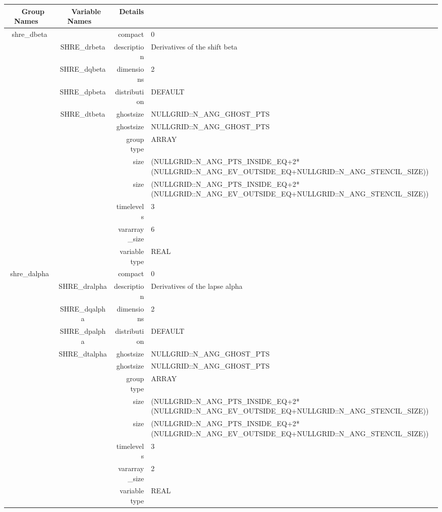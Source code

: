 \begin{tabular*}{150mm}{|c|c@{\extracolsep{\fill}}|rl|} \hline 
~ {\bf Group Names} ~ & ~ {\bf Variable Names} ~  &{\bf Details} ~ & ~ \\ 
\hline 
shre\_dbeta &  & compact & 0 \\ 
 & SHRE\_drbeta & description & Derivatives of the shift beta \\ 
 & SHRE\_dqbeta & dimensions & 2 \\ 
 & SHRE\_dpbeta & distribution & DEFAULT \\ 
 & SHRE\_dtbeta & ghostsize & NULLGRID::N\_ANG\_GHOST\_PTS \\ 
& ~ & ghostsize & NULLGRID::N\_ANG\_GHOST\_PTS \\ 
 &  & group type & ARRAY \\ 
 &  & size & (NULLGRID::N\_ANG\_PTS\_INSIDE\_EQ+2*(NULLGRID::N\_ANG\_EV\_OUTSIDE\_EQ+NULLGRID::N\_ANG\_STENCIL\_SIZE)) \\ 
& ~ & size & (NULLGRID::N\_ANG\_PTS\_INSIDE\_EQ+2*(NULLGRID::N\_ANG\_EV\_OUTSIDE\_EQ+NULLGRID::N\_ANG\_STENCIL\_SIZE)) \\ 
 &  & timelevels & 3 \\ 
 &  & vararray\_size & 6 \\ 
 &  & variable type & REAL \\ 
\hline 
shre\_dalpha &  & compact & 0 \\ 
 & SHRE\_dralpha & description & Derivatives of the lapse alpha \\ 
 & SHRE\_dqalpha & dimensions & 2 \\ 
 & SHRE\_dpalpha & distribution & DEFAULT \\ 
 & SHRE\_dtalpha & ghostsize & NULLGRID::N\_ANG\_GHOST\_PTS \\ 
& ~ & ghostsize & NULLGRID::N\_ANG\_GHOST\_PTS \\ 
 &  & group type & ARRAY \\ 
 &  & size & (NULLGRID::N\_ANG\_PTS\_INSIDE\_EQ+2*(NULLGRID::N\_ANG\_EV\_OUTSIDE\_EQ+NULLGRID::N\_ANG\_STENCIL\_SIZE)) \\ 
& ~ & size & (NULLGRID::N\_ANG\_PTS\_INSIDE\_EQ+2*(NULLGRID::N\_ANG\_EV\_OUTSIDE\_EQ+NULLGRID::N\_ANG\_STENCIL\_SIZE)) \\ 
 &  & timelevels & 3 \\ 
 &  & vararray\_size & 2 \\ 
 &  & variable type & REAL \\ 
\hline 
\end{tabular*} 


